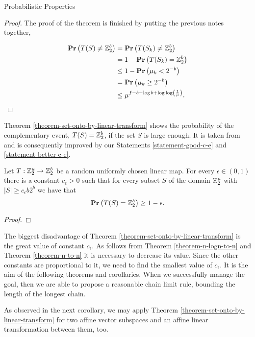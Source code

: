 \begin{section}{Probabilistic Properties}
\begin{proof}
The proof of the theorem is finished by putting the previous notes together,

\[
\begin{split}
\mathbf{Pr}\left(T(S) \neq \mathbb{Z}_{2}^{b}\right) 
	& = \mathbf{Pr}\left(T(S_k) \neq \mathbb{Z}_{2}^{b}\right)  \\
	& = 1 - \mathbf{Pr}\left(T(S_k) = \mathbb{Z}_{2}^{b}\right) \\
	& \leq 1 - \mathbf{Pr}\left(\mu_k < 2 ^ {-b}\right) \\
	& = \mathbf{Pr}\left(\mu_k \geq 2 ^ {-b}\right) \\
	& \leq \mu ^ {f - b - \log b + \log \log \left(\frac{1}{\mu}\right)} \text{.}
\end{split}
\]
\end{proof}

Theorem \ref{theorem-set-onto-by-linear-transform} shows the probability of the complementary event, $T(S) = \mathbb{Z}_{2}^{b}$, if the set $S$ is large enough. It is taken from \cite{DBLP:books/sp/Mehlhorn84} and is consequently improved by our Statements \ref{statement-good-c-e} and \ref{statement-better-c-e}.
\begin{theorem}
\label{theorem-set-onto-by-linear-transform}
Let $T: \mathbb{Z}_{2}^{u} \rightarrow \mathbb{Z}_{2}^{b}$ be a random uniformly chosen linear map. For every $\epsilon \in (0, 1)$ there is a constant $c_\epsilon > 0$ such that for every subset $S$ of the domain $\mathbb{Z}_{2}^{u}$ with $|S| \geq c_\epsilon b 2 ^ b$ we have that
\[
	\mathbf{Pr}\left(T(S) = \mathbb{Z}_{2}^{b}\right) \geq 1 - \epsilon \text{.}
\]
\end{theorem}
\begin{proof}

\end{proof}

The biggest disadvantage of Theorem \ref{theorem-set-onto-by-linear-transform} is the great value of constant $c_{\epsilon}$. As follows from Theorem \ref{theorem-n-logn-to-n} and Theorem \ref{theorem-n-to-n} it is necessary to decrease its value. Since the other constants are proportional to it, we need to find the smallest value of $c_{\epsilon}$. It is the aim of the following theorems and corollaries. When we successfully manage the goal, then we are able to propose a reasonable chain limit rule, bounding the length of the longest chain.
\end{section}

As observed in the next corollary, we may apply Theorem \ref{theorem-set-onto-by-linear-transform} for two affine vector subspaces and an affine linear transformation between them, too.

